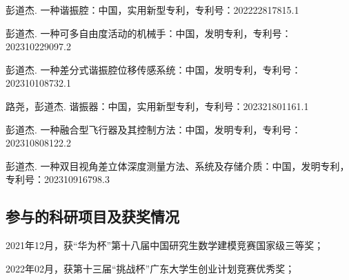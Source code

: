 \begin{resume}
  \begin{achievements}
    \item 彭道杰. 一种谐振腔：中国，实用新型专利，专利号：202222817815.1
    \item 彭道杰. 一种可多自由度活动的机械手：中国，发明专利，专利号：202310229097.2
    \item 彭道杰. 一种差分式谐振腔位移传感系统：中国，发明专利，专利号：202310108732.1
    \item 路尧，彭道杰. 谐振器：中国，实用新型专利，专利号：202321801161.1
    \item 彭道杰. 一种融合型飞行器及其控制方法：中国，发明专利，专利号：202310808122.2
    \item 彭道杰. 一种双目视角差立体深度测量方法、系统及存储介质：中国，发明专利，专利号：202310916798.3
  \end{achievements}

  \subsection*{参与的科研项目及获奖情况}
  \begin{achievements}
    \item   2021年12月，获“华为杯”第十八届中国研究生数学建模竞赛国家级三等奖；
    \item 2022年02月，获第十三届“挑战杯”广东大学生创业计划竞赛优秀奖；
  \end{achievements}

\end{resume}
